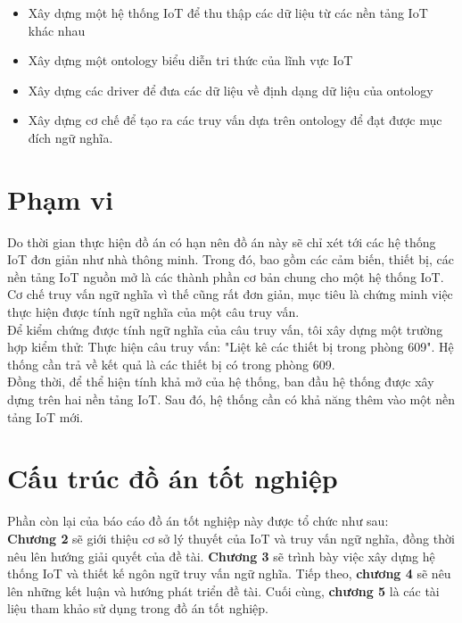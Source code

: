 \begin{itemize}
	\item Xây dựng một hệ thống IoT để thu thập các dữ liệu từ các nền tảng IoT khác nhau
	\item Xây dựng một ontology biểu diễn tri thức của lĩnh vực IoT
	\item Xây dựng các driver để đưa các dữ liệu về định dạng dữ liệu của ontology
	\item Xây dựng cơ chế để tạo ra các truy vấn dựa trên ontology để đạt được mục đích ngữ nghĩa.
\end{itemize}

\section{Phạm vi}
Do thời gian thực hiện đồ án có hạn nên đồ án này sẽ chỉ xét tới các hệ thống IoT đơn giản như nhà thông minh. Trong đó, bao gồm các cảm biến, thiết bị, các nền tảng IoT nguồn mở là các thành phần cơ bản chung cho một hệ thống IoT. Cơ chế truy vấn ngữ nghĩa vì thế cũng rất đơn giản, mục tiêu là chứng minh việc thực hiện được tính ngữ nghĩa của một câu truy vấn.\\

Để kiểm chứng được tính ngữ nghĩa của câu truy vấn, tôi xây dựng một trường hợp kiểm thử:
Thực hiện câu truy vấn: "Liệt kê các thiết bị trong phòng 609". Hệ thống cần trả về kết quả là các thiết bị có trong phòng 609. \\
Đồng thời, để thể hiện tính khả mở của hệ thống, ban đầu hệ thống được xây dựng trên hai nền tảng IoT. Sau đó, hệ thống cần có khả năng thêm vào một nền tảng IoT mới.


\section{Cấu trúc đồ án tốt nghiệp}
Phần còn lại của báo cáo đồ án tốt nghiệp này được tổ chức như sau:\\
\textbf{Chương 2} sẽ giới thiệu cơ sở lý thuyết của IoT và truy vấn ngữ nghĩa, đồng thời nêu lên hướng giải quyết của đề tài. \textbf{Chương 3} sẽ trình bày việc xây dựng hệ thống IoT và thiết kế ngôn ngữ truy vấn ngữ nghĩa. Tiếp theo, \textbf{chương 4} sẽ nêu lên những kết luận và hướng phát triển đề tài. Cuối cùng, \textbf{chương 5} là các tài liệu tham khảo sử dụng trong đồ án tốt nghiệp.
 
